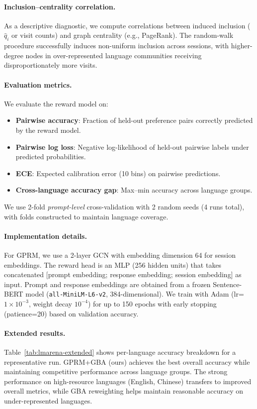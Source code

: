 \documentclass{article}
\theoremstyle{plain}
\theoremstyle{definition}
\theoremstyle{remark}
\begin{document}
\paragraph{Inclusion--centrality correlation.}
As a descriptive diagnostic, we compute correlations between induced inclusion
($\hat q_i$ or visit counts) and graph centrality (e.g., PageRank).
The random-walk procedure successfully induces non-uniform inclusion across sessions,
with higher-degree nodes in over-represented language communities receiving
disproportionately more visits.

\paragraph{Evaluation metrics.}
We evaluate the reward model on:
\begin{itemize}
    \item \textbf{Pairwise accuracy}: Fraction of held-out preference pairs correctly predicted by the reward model.
    \item \textbf{Pairwise log loss}: Negative log-likelihood of held-out pairwise labels under predicted probabilities.
    \item \textbf{ECE}: Expected calibration error (10 bins) on pairwise predictions.
    \item \textbf{Cross-language accuracy gap}: Max--min accuracy across language groups.
\end{itemize}
We use 2-fold \emph{prompt-level} cross-validation with 2 random seeds (4 runs total),
with folds constructed to maintain language coverage.

\paragraph{Implementation details.}
For GPRM, we use a 2-layer GCN with embedding dimension 64 for session embeddings. The reward head is an MLP (256 hidden units) that takes concatenated [prompt embedding; response embedding; session embedding] as input. Prompt and response embeddings are obtained from a frozen Sentence-BERT model (\texttt{all-MiniLM-L6-v2}, 384-dimensional). We train with Adam (lr=$1 \times 10^{-3}$, weight decay $10^{-4}$) for up to 150 epochs with early stopping (patience=20) based on validation accuracy.

\paragraph{Extended results.}
Table~\ref{tab:lmarena-extended} shows per-language accuracy breakdown for a representative run.
GPRM+GBA (ours) achieves the best overall accuracy while maintaining competitive performance
across language groups. The strong performance on high-resource languages (English, Chinese)
transfers to improved overall metrics, while GBA reweighting helps maintain
reasonable accuracy on under-represented languages.
\end{document}
